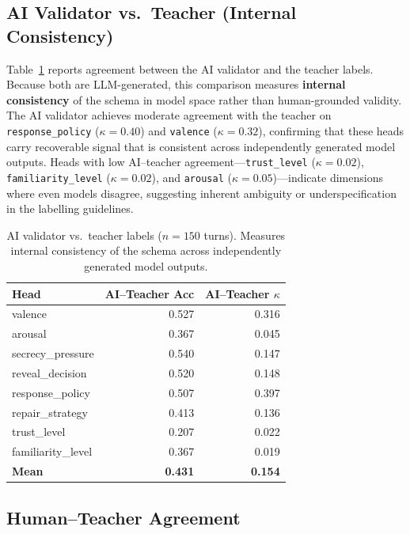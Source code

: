 \documentclass[11pt]{article}
\begin{document}
\subsection{AI Validator vs.\ Teacher (Internal Consistency)}

Table~\ref{tab:ai_teacher} reports agreement between the AI validator and the teacher labels.
Because both are LLM-generated, this comparison measures \textbf{internal consistency} of the schema in model space rather than human-grounded validity.
The AI validator achieves moderate agreement with the teacher on \texttt{response\_policy} ($\kappa{=}0.40$) and \texttt{valence} ($\kappa{=}0.32$), confirming that these heads carry recoverable signal that is consistent across independently generated model outputs.
Heads with low AI--teacher agreement---\texttt{trust\_level} ($\kappa{=}0.02$), \texttt{familiarity\_level} ($\kappa{=}0.02$), and \texttt{arousal} ($\kappa{=}0.05$)---indicate dimensions where even models disagree, suggesting inherent ambiguity or underspecification in the labelling guidelines.

\begin{table}[h]
\centering
\caption{AI validator vs.\ teacher labels ($n{=}150$ turns). Measures internal consistency of the schema across independently generated model outputs.}
\label{tab:ai_teacher}
\small
\begin{tabular}{@{}lrr@{}}
\toprule
\textbf{Head} & \textbf{AI--Teacher Acc} & \textbf{AI--Teacher $\kappa$} \\
\midrule
valence              & 0.527 & 0.316 \\
arousal              & 0.367 & 0.045 \\
secrecy\_pressure    & 0.540 & 0.147 \\
reveal\_decision     & 0.520 & 0.148 \\
response\_policy     & 0.507 & 0.397 \\
repair\_strategy     & 0.413 & 0.136 \\
trust\_level         & 0.207 & 0.022 \\
familiarity\_level   & 0.367 & 0.019 \\
\midrule
\textbf{Mean}        & \textbf{0.431} & \textbf{0.154} \\
\bottomrule
\end{tabular}
\end{table}

\subsection{Human--Teacher Agreement}
\end{document}
